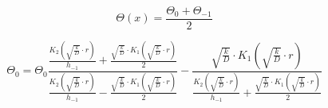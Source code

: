 \begin{equation}
\Theta(x) = \frac{\Theta_0 + \Theta_{-1}}{2}
\end{equation}

\begin{equation}
\Theta_0  = \Theta_0 \frac{\frac{K_2(\sqrt{\frac{k}{D}}\cdot r)}{h_{-1}} + \frac{\sqrt{\frac{k}{D}}\cdot K_1(\sqrt{\frac{k}{D}}\cdot r)}{2}}{\frac{K_2(\sqrt{\frac{k}{D}}\cdot r)}{h_{-1}} - \frac{\sqrt{\frac{k}{D}}\cdot K_1(\sqrt{\frac{k}{D}}\cdot r)}{2}} - \frac{\sqrt{\frac{k}{D}}\cdot K_1(\sqrt{\frac{k}{D}}\cdot r)}{\frac{K_2(\sqrt{\frac{k}{D}}\cdot r)}{h_{-1}} + \frac{\sqrt{\frac{k}{D}}\cdot K_1(\sqrt{\frac{k}{D}}\cdot r)}{2}}
\end{equation}

